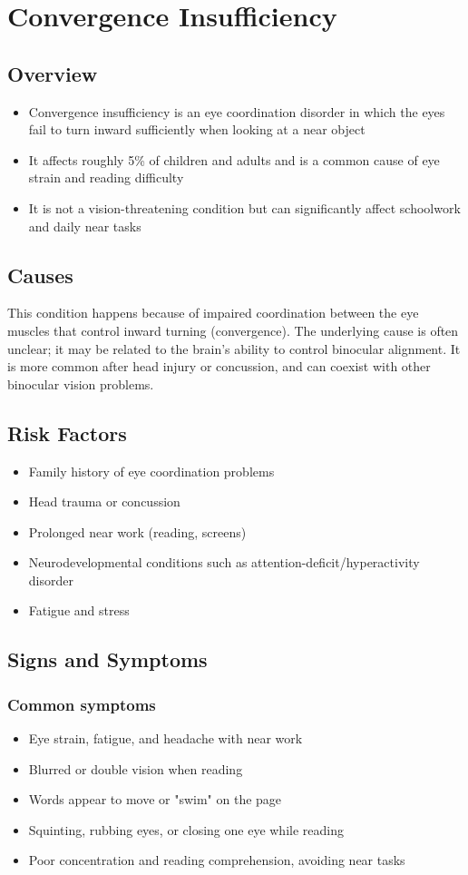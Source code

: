 \chapter{Convergence Insufficiency}
\label{sec:Convergence Insufficiency}

\section{Overview}
\begin{itemize}[noitemsep]
  \item Convergence insufficiency is an eye coordination disorder in which the eyes fail to turn inward sufficiently when looking at a near object
  \item It affects roughly 5\% of children and adults and is a common cause of eye strain and reading difficulty
  \item It is not a vision-threatening condition but can significantly affect schoolwork and daily near tasks
\end{itemize}
\section{Causes}
This condition happens because of impaired coordination between the eye muscles that control inward turning (convergence). The underlying cause is often unclear; it may be related to the brain's ability to control binocular alignment. It is more common after head injury or concussion, and can coexist with other binocular vision problems.
\section{Risk Factors}
\begin{itemize}[noitemsep]
  \item Family history of eye coordination problems
  \item Head trauma or concussion
  \item Prolonged near work (reading, screens)
  \item Neurodevelopmental conditions such as attention-deficit/hyperactivity disorder
  \item Fatigue and stress
\end{itemize}
\section{Signs and Symptoms}
\subsection{Common symptoms}
\begin{itemize}[noitemsep]
  \item Eye strain, fatigue, and headache with near work
  \item Blurred or double vision when reading
  \item Words appear to move or "swim" on the page
  \item Squinting, rubbing eyes, or closing one eye while reading
  \item Poor concentration and reading comprehension, avoiding near tasks
\end{itemize}
